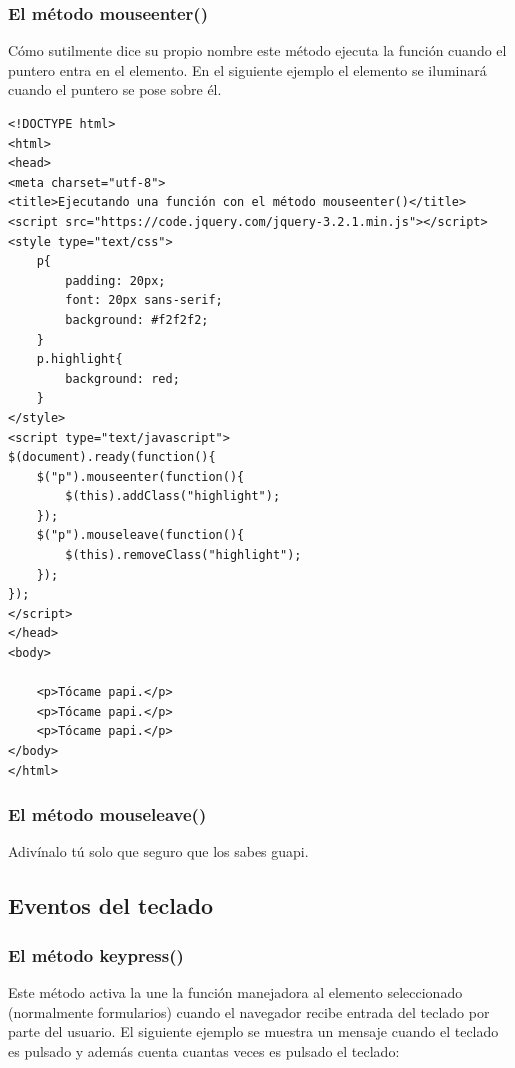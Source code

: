 \documentclass[a4paper, oneside]{article}
\begin{document}
\subsubsection{El método mouseenter()}
\label{sec:orgf7cfb84}

Cómo sutilmente dice su propio nombre este método ejecuta la función cuando el puntero entra en el elemento. En el siguiente ejemplo el elemento se iluminará cuando el puntero se pose sobre él. 

\begin{verbatim}
<!DOCTYPE html>
<html>
<head>
<meta charset="utf-8">
<title>Ejecutando una función con el método mouseenter()</title>
<script src="https://code.jquery.com/jquery-3.2.1.min.js"></script>
<style type="text/css">
    p{
        padding: 20px;
        font: 20px sans-serif;
        background: #f2f2f2;
    }
    p.highlight{
        background: red;
    }
</style>
<script type="text/javascript">
$(document).ready(function(){
    $("p").mouseenter(function(){
        $(this).addClass("highlight");
    });
    $("p").mouseleave(function(){
        $(this).removeClass("highlight");
    });
});
</script>
</head>
<body>

    <p>Tócame papi.</p>
    <p>Tócame papi.</p>
    <p>Tócame papi.</p>
</body>
</html>                                		
\end{verbatim}

\subsubsection{El método mouseleave()}
\label{sec:orgd3bb0cb}

Adivínalo tú solo que seguro que los sabes guapi.


\subsection{Eventos del teclado}
\label{sec:org52d7e0f}

\subsubsection{El método keypress()}
\label{sec:orgdb20b11}

Este método activa la une la función manejadora al elemento seleccionado (normalmente formularios) cuando el navegador recibe entrada del teclado por parte del usuario. El siguiente ejemplo se muestra un mensaje cuando el teclado es pulsado y además cuenta cuantas veces es pulsado el teclado:
\end{document}
